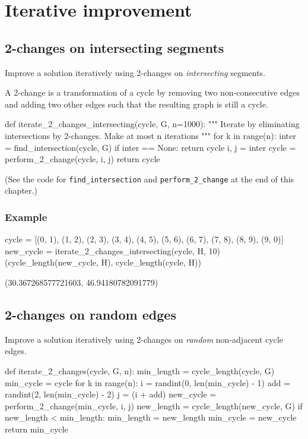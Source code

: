 \section{Iterative improvement}

\subsection{2-changes on intersecting segments}

Improve a solution iteratively using 2-changes on \emph{intersecting} segments.

A 2-change is a transformation of a cycle by removing two non-consecutive edges and adding two other edges such that the resulting graph is still a cycle.

\medskip
\begin{sageCell}
def iterate_2_changes_intersecting(cycle, G, n=1000):
    """
    Iterate by eliminating intersections by 2-changes. Make at most n iterations
    """
    for k in range(n):
        inter = find_intersection(cycle, G)
        if inter == None:
            return cycle
        i, j = inter
        cycle = perform_2_change(cycle, i, j)
    return cycle
\end{sageCell}
(See the code for \verb`find_intersection` and \verb`perform_2_change` at the end of this chapter.)

\subsubsection*{Example}

\begin{sageCell}
    cycle = [(0, 1), (1, 2), (2, 3), (3, 4), (4, 5), (5, 6), (6, 7), (7, 8), (8, 9),
      (9, 0)]
    new_cycle = iterate_2_changes_intersecting(cycle, H, 10)
    (cycle_length(new_cycle, H), cycle_length(cycle, H))
\end{sageCell}
\begin{outCell}
    (30.367268577721603, 46.94180782091779)
\end{outCell}

\subsection{2-changes on random edges}

Improve a solution iteratively using 2-changes on \emph{random}
non-adjacent cycle edges.

\medskip
\begin{sageCell}
def iterate_2_changes(cycle, G, n):
    min_length = cycle_length(cycle, G)
    min_cycle = cycle
    for k in range(n):
        i = randint(0, len(min_cycle) - 1)
        add = randint(2, len(min_cycle) - 2)
        j = (i + add) %
        new_cycle = perform_2_change(min_cycle, i, j)
        new_length = cycle_length(new_cycle, G)
        if new_length < min_length:
            min_length = new_length
            min_cycle = new_cycle
    return min_cycle
\end{sageCell}

